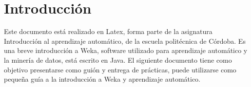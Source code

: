 \section{Introducción} \label{ch:introduccion}

Este documento está realizado en Latex, forma parte de la asignatura Introducción al aprendizaje automático, de la escuela politécnica de Córdoba.
Es una breve introducción a Weka, software utilizado para aprendizaje automático y la minería de datos, está escrito en Java.
\newline
El siguiente documento tiene como objetivo presentarse como guión y entrega de prácticas, puede utilizarse como pequeña guía a la introducción a Weka y aprendizaje automático.